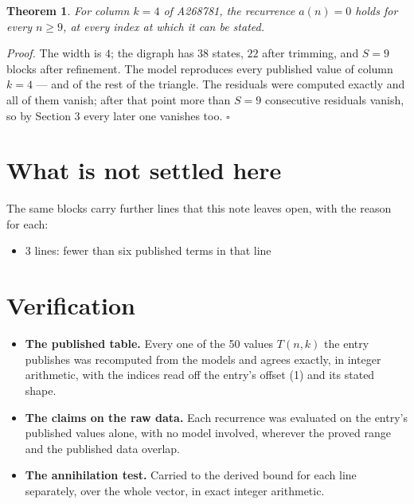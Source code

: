 \documentclass[11pt]{article}
\newtheorem{theorem}{Theorem}
\theoremstyle{definition}
\begin{document}
\begin{theorem} For column $k = 4$ of A268781, the recurrence $a(n) = 0$ holds for every $n \ge 9$, at every index at which it can be stated.\end{theorem}

{\itshape Proof.} The width is $4$; the digraph has $38$ states, $22$ after trimming, and $S = 9$ blocks after refinement. The model reproduces every published value of column $k = 4$ --- and of the rest of the triangle. The residuals were computed exactly and all of them vanish; after that point more than $S = 9$ consecutive residuals vanish, so by Section 3 every later one vanishes too. $\square$

\section{What is not settled here}

The same blocks carry further lines that this note leaves open, with the reason for each:

\begin{itemize}

\item 3 lines: fewer than six published terms in that line

\end{itemize}

\section{Verification}

\begin{itemize}

\item {\bfseries The published table.} Every one of the 50 values $T(n,k)$ the entry publishes was recomputed from the models and agrees exactly, in integer arithmetic, with the indices read off the entry's offset (1) and its stated shape.

\item {\bfseries The claims on the raw data.} Each recurrence was evaluated on the entry's published values alone, with no model involved, wherever the proved range and the published data overlap.

\item {\bfseries The annihilation test.} Carried to the derived bound for each line separately, over the whole vector, in exact integer arithmetic.

\end{itemize}
\end{document}
